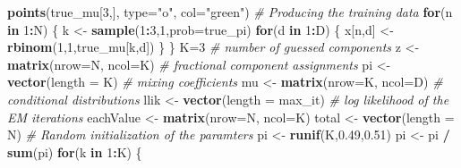 \documentclass[]{article}
\newenvironment{Shaded}{\begin{snugshade}}{\end{snugshade}}
\newcommand{\KeywordTok}[1]{\textcolor[rgb]{0.13,0.29,0.53}{\textbf{#1}}}
\newcommand{\DataTypeTok}[1]{\textcolor[rgb]{0.13,0.29,0.53}{#1}}
\newcommand{\DecValTok}[1]{\textcolor[rgb]{0.00,0.00,0.81}{#1}}
\newcommand{\FloatTok}[1]{\textcolor[rgb]{0.00,0.00,0.81}{#1}}
\newcommand{\StringTok}[1]{\textcolor[rgb]{0.31,0.60,0.02}{#1}}
\newcommand{\CommentTok}[1]{\textcolor[rgb]{0.56,0.35,0.01}{\textit{#1}}}
\newcommand{\ControlFlowTok}[1]{\textcolor[rgb]{0.13,0.29,0.53}{\textbf{#1}}}
\newcommand{\OperatorTok}[1]{\textcolor[rgb]{0.81,0.36,0.00}{\textbf{#1}}}
\newcommand{\NormalTok}[1]{#1}
\begin{document}
\begin{Shaded}
\begin{Highlighting}[]
\KeywordTok{points}\NormalTok{(true_mu[}\DecValTok{3}\NormalTok{,], }\DataTypeTok{type=}\StringTok{"o"}\NormalTok{, }\DataTypeTok{col=}\StringTok{"green"}\NormalTok{)}
\CommentTok{# Producing the training data}
\ControlFlowTok{for}\NormalTok{(n }\ControlFlowTok{in} \DecValTok{1}\OperatorTok{:}\NormalTok{N) \{}
\NormalTok{k <-}\StringTok{ }\KeywordTok{sample}\NormalTok{(}\DecValTok{1}\OperatorTok{:}\DecValTok{3}\NormalTok{,}\DecValTok{1}\NormalTok{,}\DataTypeTok{prob=}\NormalTok{true_pi)}
\ControlFlowTok{for}\NormalTok{(d }\ControlFlowTok{in} \DecValTok{1}\OperatorTok{:}\NormalTok{D) \{}
\NormalTok{x[n,d] <-}\StringTok{ }\KeywordTok{rbinom}\NormalTok{(}\DecValTok{1}\NormalTok{,}\DecValTok{1}\NormalTok{,true_mu[k,d])}
\NormalTok{\}}
\NormalTok{\}}
\NormalTok{K=}\DecValTok{3} \CommentTok{# number of guessed components}
\NormalTok{z <-}\StringTok{ }\KeywordTok{matrix}\NormalTok{(}\DataTypeTok{nrow=}\NormalTok{N, }\DataTypeTok{ncol=}\NormalTok{K) }\CommentTok{# fractional component assignments}
\NormalTok{pi <-}\StringTok{ }\KeywordTok{vector}\NormalTok{(}\DataTypeTok{length =}\NormalTok{ K) }\CommentTok{# mixing coefficients}
\NormalTok{mu <-}\StringTok{ }\KeywordTok{matrix}\NormalTok{(}\DataTypeTok{nrow=}\NormalTok{K, }\DataTypeTok{ncol=}\NormalTok{D) }\CommentTok{# conditional distributions}
\NormalTok{llik <-}\StringTok{ }\KeywordTok{vector}\NormalTok{(}\DataTypeTok{length =}\NormalTok{ max_it) }\CommentTok{# log likelihood of the EM iterations}
\NormalTok{eachValue <-}\StringTok{ }\KeywordTok{matrix}\NormalTok{(}\DataTypeTok{nrow=}\NormalTok{N, }\DataTypeTok{ncol=}\NormalTok{K)}
\NormalTok{total <-}\StringTok{ }\KeywordTok{vector}\NormalTok{(}\DataTypeTok{length =}\NormalTok{ N)}
\CommentTok{# Random initialization of the paramters}
\NormalTok{pi <-}\StringTok{ }\KeywordTok{runif}\NormalTok{(K,}\FloatTok{0.49}\NormalTok{,}\FloatTok{0.51}\NormalTok{)}
\NormalTok{pi <-}\StringTok{ }\NormalTok{pi }\OperatorTok{/}\StringTok{ }\KeywordTok{sum}\NormalTok{(pi)}
\ControlFlowTok{for}\NormalTok{(k }\ControlFlowTok{in} \DecValTok{1}\OperatorTok{:}\NormalTok{K) \{}


\end{Highlighting}
\end{Shaded}
\end{document}

